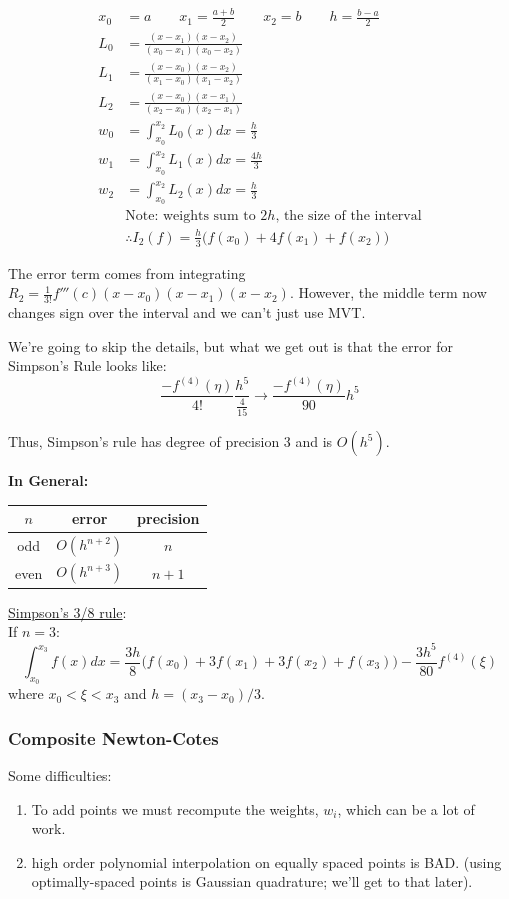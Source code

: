 \documentclass[12pt]{article}
\begin{document}
\begin{align*}
x_0 &= a \qquad x_1 = \frac{a+b}{2} \qquad x_2=b \qquad h=\frac{b-a}{2}\\
%
L_0 &= \frac{(x-x_1)(x-x_2)}{(x_0-x_1)(x_0-x_2)}\\
L_1 &= \frac{(x-x_0)(x-x_2)}{(x_1-x_0)(x_1-x_2)}\\
L_2 &= \frac{(x-x_0)(x-x_1)}{(x_2-x_0)(x_2-x_1)}\\
%
w_0 &= \int_{x_0}^{x_2} L_0(x)dx = \frac{h}{3}\\
w_1 &= \int_{x_0}^{x_2} L_1(x)dx = \frac{4h}{3}\\
w_2 &= \int_{x_0}^{x_2} L_2(x)dx = \frac{h}{3}\\
&\text{Note: weights sum to }2h\text{, the size of the interval}\nonumber\\
%
&\therefore I_2(f) = \frac{h}{3}\bigl(f(x_0) + 4f(x_1) + f(x_2)\bigr) 
\end{align*}
 
The error term comes from integrating $R_2 = \frac{1}{3!}f'''(c)(x-x_0)(x-x_1)(x-x_2)$. However, the middle term now changes sign over the interval and we can't just use MVT.

We're going to skip the details, but what we get out is that the error for Simpson's Rule looks like:
\[\frac{-f^{(4)}(\eta)}{4!}\frac{h^5}{\frac{4}{15}} \rightarrow \boxed{\frac{-f^{(4)}(\eta)}{90}h^5}\]

Thus, Simpson's rule has degree of precision 3 and is $O(h^5)$.

\textbf{In General:}
\begin{center}
\begin{tabular}{c c c}
$n$  & error        & precision \\ \hline
odd  & $O(h^{n+2})$ & $n$ \\
even & $O(h^{n+3})$ & $n+1$ \\
\end{tabular}
\end{center}

\underline{Simpson's 3/8 rule}:\\
If $n=3$:
\[\int_{x_0}^{x_3} f(x)dx = \frac{3h}{8}\bigl(f(x_0) + 3f(x_1) + 3f(x_2) + f(x_3)\bigr) - \frac{3h^5}{80}f^{(4)}(\xi)\]
where $x_0 < \xi < x_3$ and $h=(x_3 - x_0)/3$.

\subsubsection*{Composite Newton-Cotes}
Some difficulties:
\begin{enumerate}
\item To add points we must recompute the weights, $w_i$, which can be a lot of work.
\item high order polynomial interpolation on equally spaced points is BAD. (using optimally-spaced points is Gaussian quadrature; we'll get to that later).
\end{enumerate}
\end{document}
